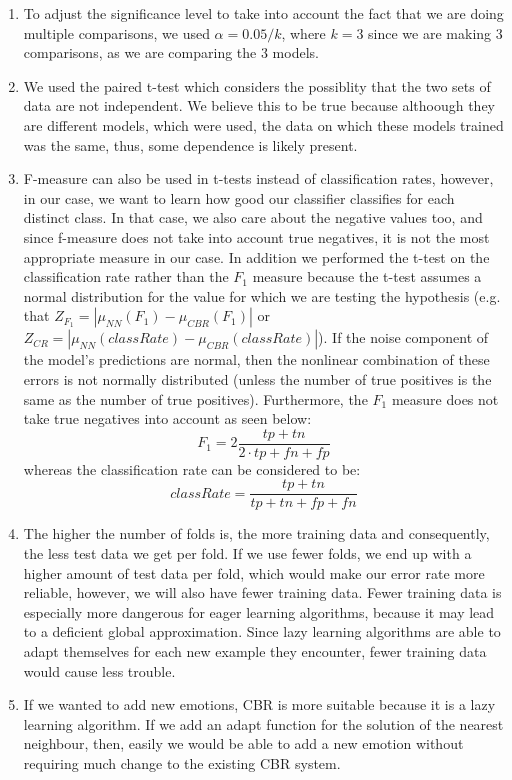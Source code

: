 \documentclass[a4paper,12pt,oneside,final]{report}
\begin{document}
\begin{enumerate}
\begin{itemize}
\end{itemize}

\item To adjust the significance level to take into account the fact that we are doing multiple comparisons, we used $\alpha = 0.05 / k$, where $k = 3$ since we are making 3 comparisons, as we are comparing the 3 models.

\item We used the paired t-test which considers the possiblity that the two sets of data are not independent.  We believe this to be true because althoough they are different models, which were used, the data on which these models trained was the same, thus, some dependence is likely present.

\item F-measure can also be used in t-tests instead of classification rates, however, in our case, we want to learn how good our classifier classifies for each distinct class. In that case, we also care about the negative values too, and since f-measure does not take into account true negatives, it is not the most appropriate measure in our case. In addition we performed the t-test on the classification rate rather than the $F_1$ measure because the t-test assumes a normal distribution for the value for which we are testing the hypothesis (e.g. that $Z_{F_1} = |\mu_{NN}(F_1) - \mu_{CBR}(F_1)|$ or $Z_{CR} = |\mu_{NN}(classRate) - \mu_{CBR}(classRate)|$).  If the noise component of the model's predictions are normal, then the nonlinear combination of these errors is not normally distributed (unless the number of true positives is the same as the number of true positives).  Furthermore, the $F_1$ measure does not take true negatives into account as seen below:
$$
F_1 = 2\frac{tp + tn}{2\cdot tp + fn + fp}
$$
whereas the classification rate can be considered to be:
$$
classRate = \frac{tp + tn}{tp + tn + fp + fn}
$$
\item The higher the number of folds is, the more training data and consequently, the less test data we get per fold. If we use fewer folds, we end up with a higher amount of test data per fold, which would make our error rate more reliable, however, we will also have fewer training data. Fewer training data is especially more dangerous for eager learning algorithms, because it may lead to a deficient global approximation. Since lazy learning algorithms are able to adapt themselves for each new example they encounter, fewer training data would cause less trouble.

\item If we wanted to add new emotions, CBR is more suitable because it is a lazy learning algorithm.  If we add an adapt function for the solution of the nearest neighbour, then, easily we would be able to add a new emotion without requiring much change to the existing CBR system.
    

\end{enumerate}
\end{document}
